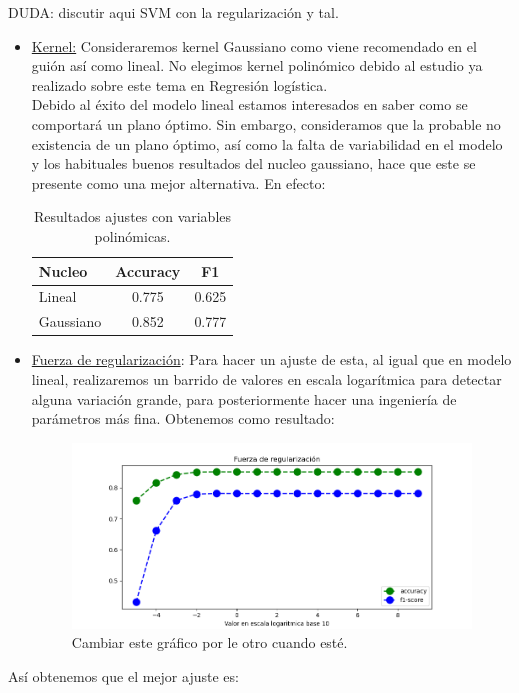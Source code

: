 \documentclass[11pt,a4paper]{article}
\begin{document}
DUDA: discutir aqui SVM con la regularización y tal.
\begin{itemize}
\item \underline{Kernel:} Consideraremos kernel Gaussiano como viene recomendado en el guión así como lineal. No elegimos kernel polinómico debido al estudio ya realizado sobre este tema en Regresión logística.\\

  Debido al éxito del modelo lineal estamos interesados en saber como se comportará un plano óptimo. Sin embargo, consideramos que la probable no existencia de un plano
  óptimo, así como la falta de variabilidad en el modelo y los habituales buenos resultados del nucleo gaussiano, hace que este se presente como una mejor alternativa. En efecto:

\begin{table}[h]
\begin{center}
\begin{tabular}{|l|c|c|}
\hline
	Nucleo & Accuracy & F1 \\ \hline
Lineal & 0.775 & 0.625 \\
Gaussiano & 0.852 & 0.777  \\\hline
\end{tabular}
\caption{Resultados ajustes con variables polinómicas.}

\end{center}
\end{table}

\item \underline{Fuerza de regularización}: Para hacer un ajuste de esta, al igual que en modelo lineal, realizaremos un barrido de valores en escala logarítmica para detectar alguna variación grande, para posteriormente hacer una ingeniería de parámetros más fina. Obtenemos como resultado:
  \newpage
    \begin{figure}[h!]
      \label{figure:regularization}
      \centering
      \includegraphics[width=\textwidth]{./figures/regularizacion_rl.png}
      \caption{Cambiar este gráfico por le otro cuando esté.}
    \end{figure}
  

\end{itemize}
Así obtenemos que el mejor ajuste es:
\end{document}
